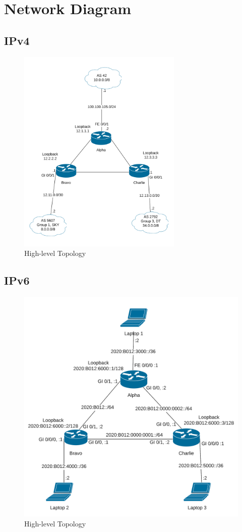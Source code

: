 \chapter{Network Diagram}
\section{IPv4}
\begin{figure}[!ht]
	\caption{High-level Topology}
	\centering
	\includegraphics[width=0.7\textwidth]{images/IPv4BGPPeers.png}
\end{figure}
\clearpage
\section{IPv6}
\begin{figure}[!ht]
	\caption{High-level Topology}
	\centering
	\includegraphics[width=\textwidth]{images/IPv6.png}
\end{figure}
\clearpage
